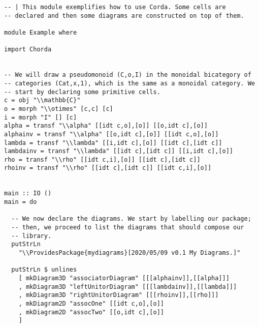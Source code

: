 \documentclass{article}
\begin{document}
\begin{verbatim}
-- | This module exemplifies how to use Corda. Some cells are
-- declared and then some diagrams are constructed on top of them.

module Example where

import Chorda


-- We will draw a pseudomonoid (C,o,I) in the monoidal bicategory of
-- categories (Cat,x,1), which is the same as a monoidal category. We
-- start by declaring some primitive cells.
c = obj "\\mathbb{C}"
o = morph "\\otimes" [c,c] [c]
i = morph "I" [] [c]
alpha = transf "\\alpha" [[idt c,o],[o]] [[o,idt c],[o]]
alphainv = transf "\\alpha" [[o,idt c],[o]] [[idt c,o],[o]]
lambda = transf "\\lambda" [[i,idt c],[o]] [[idt c],[idt c]]
lambdainv = transf "\\lambda" [[idt c],[idt c]] [[i,idt c],[o]]
rho = transf "\\rho" [[idt c,i],[o]] [[idt c],[idt c]]
rhoinv = transf "\\rho" [[idt c],[idt c]] [[idt c,i],[o]]


main :: IO ()
main = do

  -- We now declare the diagrams. We start by labelling our package;
  -- then, we proceed to list the diagrams that should compose our
  -- library.
  putStrLn
    "\\ProvidesPackage{mydiagrams}[2020/05/09 v0.1 My Diagrams.]"

  putStrLn $ unlines
    [ mkDiagram3D "associatorDiagram" [[[alphainv]],[[alpha]]]
    , mkDiagram3D "leftUnitorDiagram" [[[lambdainv]],[[lambda]]]
    , mkDiagram3D "rightUnitorDiagram" [[[rhoinv]],[[rho]]]
    , mkDiagram2D "assocOne" [[idt c,o],[o]]
    , mkDiagram2D "assocTwo" [[o,idt c],[o]]
    ]
\end{verbatim}
\end{document}

